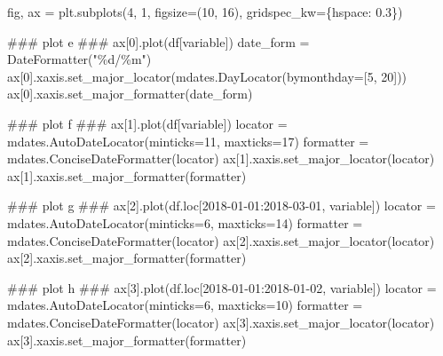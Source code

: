 \documentclass[
  letterpaper,
  DIV=11,
  numbers=noendperiod,
  oneside]{scrreprt}
\newenvironment{Shaded}{\begin{snugshade}}{\end{snugshade}}
\newcommand{\AlertTok}[1]{\textcolor[rgb]{0.68,0.00,0.00}{#1}}
\newcommand{\CommentTok}[1]{\textcolor[rgb]{0.37,0.37,0.37}{#1}}
\newcommand{\DecValTok}[1]{\textcolor[rgb]{0.68,0.00,0.00}{#1}}
\newcommand{\FloatTok}[1]{\textcolor[rgb]{0.68,0.00,0.00}{#1}}
\newcommand{\NormalTok}[1]{\textcolor[rgb]{0.00,0.23,0.31}{#1}}
\newcommand{\OperatorTok}[1]{\textcolor[rgb]{0.37,0.37,0.37}{#1}}
\newcommand{\SpecialCharTok}[1]{\textcolor[rgb]{0.37,0.37,0.37}{#1}}
\newcommand{\StringTok}[1]{\textcolor[rgb]{0.13,0.47,0.30}{#1}}
\begin{document}
\begin{Shaded}
\begin{Highlighting}[]
\NormalTok{fig, ax }\OperatorTok{=}\NormalTok{ plt.subplots(}\DecValTok{4}\NormalTok{, }\DecValTok{1}\NormalTok{, figsize}\OperatorTok{=}\NormalTok{(}\DecValTok{10}\NormalTok{, }\DecValTok{16}\NormalTok{),}
\NormalTok{                       gridspec\_kw}\OperatorTok{=}\NormalTok{\{}\StringTok{\textquotesingle{}hspace\textquotesingle{}}\NormalTok{: }\FloatTok{0.3}\NormalTok{\})}

\CommentTok{\#\#\# plot e }\AlertTok{\#\#\#}
\NormalTok{ax[}\DecValTok{0}\NormalTok{].plot(df[}\StringTok{\textquotesingle{}variable\textquotesingle{}}\NormalTok{])}
\NormalTok{date\_form }\OperatorTok{=}\NormalTok{ DateFormatter(}\StringTok{"}\SpecialCharTok{\%d}\StringTok{/\%m"}\NormalTok{)}
\NormalTok{ax[}\DecValTok{0}\NormalTok{].xaxis.set\_major\_locator(mdates.DayLocator(bymonthday}\OperatorTok{=}\NormalTok{[}\DecValTok{5}\NormalTok{, }\DecValTok{20}\NormalTok{]))}
\NormalTok{ax[}\DecValTok{0}\NormalTok{].xaxis.set\_major\_formatter(date\_form)}

\CommentTok{\#\#\# plot f }\AlertTok{\#\#\#}
\NormalTok{ax[}\DecValTok{1}\NormalTok{].plot(df[}\StringTok{\textquotesingle{}variable\textquotesingle{}}\NormalTok{])}
\NormalTok{locator }\OperatorTok{=}\NormalTok{ mdates.AutoDateLocator(minticks}\OperatorTok{=}\DecValTok{11}\NormalTok{, maxticks}\OperatorTok{=}\DecValTok{17}\NormalTok{)}
\NormalTok{formatter }\OperatorTok{=}\NormalTok{ mdates.ConciseDateFormatter(locator)}
\NormalTok{ax[}\DecValTok{1}\NormalTok{].xaxis.set\_major\_locator(locator)}
\NormalTok{ax[}\DecValTok{1}\NormalTok{].xaxis.set\_major\_formatter(formatter)}

\CommentTok{\#\#\# plot g }\AlertTok{\#\#\#}
\NormalTok{ax[}\DecValTok{2}\NormalTok{].plot(df.loc[}\StringTok{\textquotesingle{}2018{-}01{-}01\textquotesingle{}}\NormalTok{:}\StringTok{\textquotesingle{}2018{-}03{-}01\textquotesingle{}}\NormalTok{, }\StringTok{\textquotesingle{}variable\textquotesingle{}}\NormalTok{])}
\NormalTok{locator }\OperatorTok{=}\NormalTok{ mdates.AutoDateLocator(minticks}\OperatorTok{=}\DecValTok{6}\NormalTok{, maxticks}\OperatorTok{=}\DecValTok{14}\NormalTok{)}
\NormalTok{formatter }\OperatorTok{=}\NormalTok{ mdates.ConciseDateFormatter(locator)}
\NormalTok{ax[}\DecValTok{2}\NormalTok{].xaxis.set\_major\_locator(locator)}
\NormalTok{ax[}\DecValTok{2}\NormalTok{].xaxis.set\_major\_formatter(formatter)}

\CommentTok{\#\#\# plot h }\AlertTok{\#\#\#}
\NormalTok{ax[}\DecValTok{3}\NormalTok{].plot(df.loc[}\StringTok{\textquotesingle{}2018{-}01{-}01\textquotesingle{}}\NormalTok{:}\StringTok{\textquotesingle{}2018{-}01{-}02\textquotesingle{}}\NormalTok{, }\StringTok{\textquotesingle{}variable\textquotesingle{}}\NormalTok{])}
\NormalTok{locator }\OperatorTok{=}\NormalTok{ mdates.AutoDateLocator(minticks}\OperatorTok{=}\DecValTok{6}\NormalTok{, maxticks}\OperatorTok{=}\DecValTok{10}\NormalTok{)}
\NormalTok{formatter }\OperatorTok{=}\NormalTok{ mdates.ConciseDateFormatter(locator)}
\NormalTok{ax[}\DecValTok{3}\NormalTok{].xaxis.set\_major\_locator(locator)}
\NormalTok{ax[}\DecValTok{3}\NormalTok{].xaxis.set\_major\_formatter(formatter)}


\end{Highlighting}
\end{Shaded}
\end{document}

